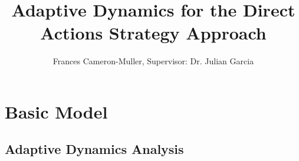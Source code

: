 \documentclass[]{llncs}
\begin{document}
\title{Adaptive Dynamics for the Direct Actions Strategy Approach}

\author{Frances Cameron-Muller, Supervisor: Dr. Julian Garcia}


\maketitle    

\section{Basic Model}

\subsection{Adaptive Dynamics Analysis}
\end{document}
